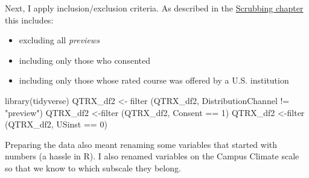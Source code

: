 \documentclass[
  11pt,
]{book}
\newenvironment{Shaded}{\begin{snugshade}}{\end{snugshade}}
\newcommand{\DecValTok}[1]{\textcolor[rgb]{0.00,0.00,0.81}{#1}}
\newcommand{\FunctionTok}[1]{\textcolor[rgb]{0.00,0.00,0.00}{#1}}
\newcommand{\NormalTok}[1]{#1}
\newcommand{\OtherTok}[1]{\textcolor[rgb]{0.56,0.35,0.01}{#1}}
\newcommand{\SpecialCharTok}[1]{\textcolor[rgb]{0.00,0.00,0.00}{#1}}
\newcommand{\StringTok}[1]{\textcolor[rgb]{0.31,0.60,0.02}{#1}}
\providecommand{\tightlist}{%
  \setlength{\itemsep}{0pt}\setlength{\parskip}{0pt}}
\begin{document}
Next, I apply inclusion/exclusion criteria. As described in the \protect\hyperlink{scrub}{Scrubbing chapter} this includes:

\begin{itemize}
\tightlist
\item
  excluding all \emph{previews}
\item
  including only those who consented
\item
  including only those whose rated course was offered by a U.S. institution
\end{itemize}

\begin{Shaded}
\begin{Highlighting}[]
\FunctionTok{library}\NormalTok{(tidyverse)}
\NormalTok{QTRX\_df2 }\OtherTok{\textless{}{-}} \FunctionTok{filter}\NormalTok{ (QTRX\_df2, DistributionChannel }\SpecialCharTok{!=} \StringTok{"preview"}\NormalTok{)}
\NormalTok{QTRX\_df2 }\OtherTok{\textless{}{-}}\FunctionTok{filter}\NormalTok{ (QTRX\_df2, Consent }\SpecialCharTok{==} \DecValTok{1}\NormalTok{)}
\NormalTok{QTRX\_df2 }\OtherTok{\textless{}{-}}\FunctionTok{filter}\NormalTok{ (QTRX\_df2, USinst }\SpecialCharTok{==} \DecValTok{0}\NormalTok{)}
\end{Highlighting}
\end{Shaded}

Preparing the data also meant renaming some variables that started with numbers (a hassle in R). I also renamed variables on the Campus Climate scale so that we know to which subscale they belong.
\end{document}

